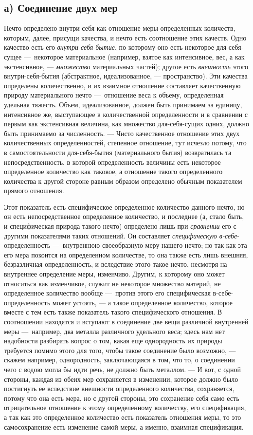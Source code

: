 \subsection[а) Соединение двух мер]{а) Соединение двух мер}
Нечто определено внутри себя как отношение меры
определенных количеств, которым, далее, присущи качества, и нечто есть
соотношение этих качеств. Одно качество есть его
{\em внутри-себя-бытие}, по которому оно есть некоторое
для-себя-сущее —~некоторое материальное (например, взятое как интенсивное,
вес, а как экстенсивное, — {\em множество} материальных
частей); другое есть {\em внешность} этого
внутри-себя-бытия (абстрактное, идеализованное, — пространство). Эти
качества определены количественно, и их взаимное отношение составляет
качественную природу материального нечто —~отношение веса к объему,
определенная удельная тяжесть. Объем, идеализованное, должен быть принимаем
за единицу, интенсивное же, выступающее в количественной определенности и в
сравнении с первым как экстенсивная величина, как множество для-себя-сущих
одних, должно быть принимаемо за численность. — Чисто качественное
отношение этих двух количественных определенностей, степенное отношение,
тут исчезло потому, что в самостоятельности для-себя-бытия (материального
бытия) возвратилась та непосредственность, в которой определенность
величины есть некоторое определенное количество как таковое, а отношение
такого определенного количества к другой стороне равным образом определено
обычным показателем прямого отношения.

Этот показатель есть специфическое определенное количество данного нечто, но
он есть непосредственное определенное количество, и последнее (а, стало
быть, и специфическая природа такого нечто) определено лишь при
{\em сравнении} его с другими показателями таких
отношений. Он составляет {\em специфическую в-себе}-определенность —~внутреннюю своеобразную меру нашего нечто; но
так как эта его мера покоится на определенном количестве, то она также есть
лишь внешняя, безразличная определенность, и вследствие этого такое нечто,
несмотря на внутреннее определение меры, изменчиво. Другим, к которому оно
может относиться как изменчивое, служит не некоторое множество материй, не
определенное количество вообще —~против этого его специфическая
в-себе-определенность может устоять, — а такое определенное количество,
которое вместе с тем есть также показатель такого специфического отношения.
В соотношении находятся и вступают в соединение две вещи различной
внутренней меры —~например, два металла различного удельного веса; здесь
нам нет надобности разбирать вопрос о том, какая еще однородность их
природы требуется помимо этого для того, чтобы такое соединение было
возможно, — скажем например, однородность, заключающаяся в том, что то, о
соединении чего с водою могла бы идти речь, не должно быть металлом. — И
вот, с одной стороны, каждая из обеих мер сохраняется в изменении, которое
должно было постигнуть ее вследствие внешности определенного количества,
сохраняется, потому что она есть мера, но с другой стороны, это сохранение
себя само есть отрицательное отношение к этому определенному количеству,
его спецификация, а так как это определенное количество есть показатель
отношения меры, то это самосохранение есть изменение самой меры, а именно,
взаимная спецификация.

